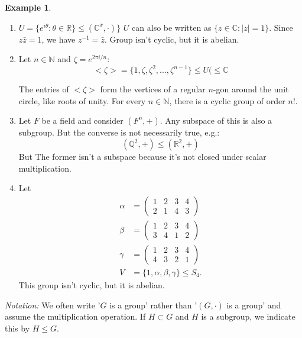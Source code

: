\documentclass{report}
\theoremstyle{remark}
\theoremstyle{definition}
\theoremstyle{definition}
\newtheorem{example}[theorem]{Example}
\theoremstyle{theorem}
\begin{document}
\begin{example}
\begin{enumerate}[label=\textcircled{\tiny{\arabic*}}]
    \item $U=\{e^{i\theta}: \theta \in \mathbb{R}\} \leq (\mathbb{C}^x, \cdot)\}$
    $U$ can also be written as $\{z \in \mathbb{C}: |z|=1\}$. Since $z\bar{z}=1$, we have $z^{-1}=\bar{z}$. Group isn't cyclic, but it is abelian.
    \item Let $n \in \mathbb{N}$ and $\zeta=e^{2\pi i/n}$:
    \[<\zeta>=\{1, \zeta, \zeta^2, ..., \zeta^{n-1}\} \leq U (\leq \mathbb{C}\]
    \par
    The entries of $<\zeta>$ form the vertices of a regular $n$-gon around the unit circle, like roots of unity. For every $n \in \mathbb{N}$, there is a cyclic group of order $n!$.
    \item Let $F$ be a field and consider $(F^n, +)$. Any subspace of this is also a subgroup. But the converse is not necessarily true, e.g.:
    \[(\mathbb{Q}^2, +) \leq (\mathbb{R}^2, +)\]
    But The former isn't a subspace because it's not closed under scalar multiplication.
    \item Let
    \begin{align*}
        \alpha&=\begin{pmatrix}
        1&2&3&4\\
        2&1&4&3
        \end{pmatrix}\\
        \beta &= \begin{pmatrix}
        1&2&3&4\\
        3&4&1&2
        \end{pmatrix}\\
        \gamma &= \begin{pmatrix}
        1&2&3&4\\
        4&3&2&1
        \end{pmatrix}\\
        V&=\{1, \alpha, \beta, \gamma\} \leq S_4.
    \end{align*}
    This group isn't cyclic, but it is abelian.
\end{enumerate}
\end{example}
\emph{Notation:} We often write '$G$ is a group' rather than '$(G,\cdot)$ is a group' and assume the multiplication operation. If $H \subset G$ and $H $ is a subgroup, we indicate this by $H \leq G$.
\end{document}

